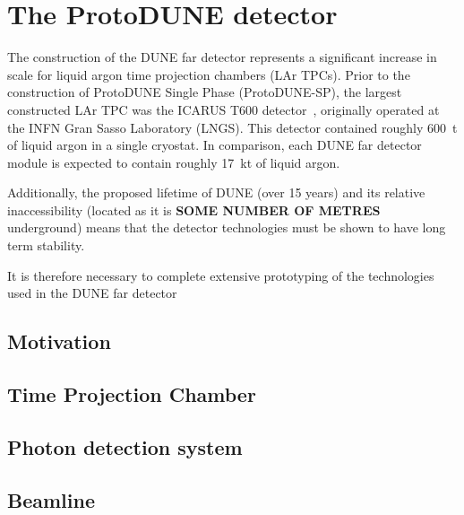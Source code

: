 \chapter{The ProtoDUNE detector}
\label{sec:protodune}

The construction of the DUNE far detector represents a significant increase in scale for liquid argon time projection chambers (LAr TPCs).
Prior to the construction of ProtoDUNE Single Phase (ProtoDUNE-SP), the largest constructed LAr TPC was the ICARUS T600 detector~\cite{icarus}, originally operated at the INFN Gran Sasso Laboratory (LNGS).
This detector contained roughly \SI{600}{\tonne} of liquid argon in a single cryostat.
In comparison, each DUNE far detector module is expected to contain roughly \SI{17}{\kilo\tonne} of liquid argon.
 
Additionally, the proposed lifetime of DUNE (over 15 years) and its relative inaccessibility (located as it is \textbf{SOME NUMBER OF METRES} underground) means that the detector technologies must be shown to have long term stability.
 
It is therefore necessary to complete extensive prototyping of the technologies used in the DUNE far detector


\section{Motivation}
\label{sec:protodune:motivation}

\section{Time Projection Chamber}
\label{sec:protodune:tpc}

\section{Photon detection system}
\label{sec:protodune:pds}

\section{Beamline}
\label{sec:protodune:beamline}